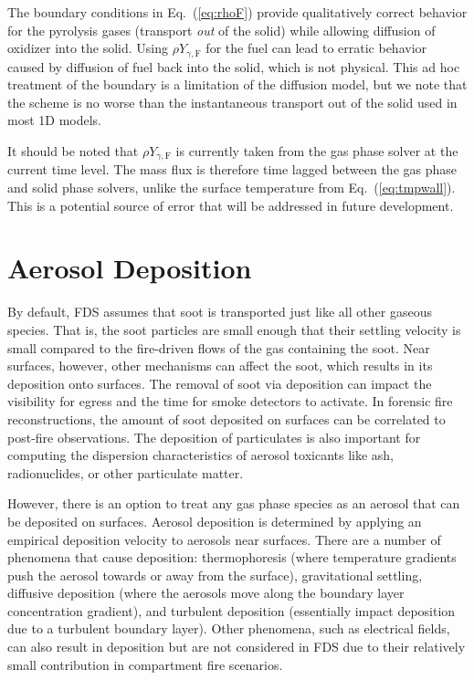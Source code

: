 The boundary conditions in Eq.~(\ref{eq:rhoF}) provide qualitatively correct behavior for the pyrolysis gases (transport \emph{out} of the solid) while allowing diffusion of oxidizer into the solid.  Using $\rho Y_{\gamma,\mathrm{F}}$ for the fuel can lead to erratic behavior caused by diffusion of fuel back into the solid, which is not physical.  This ad hoc treatment of the boundary is a limitation of the diffusion model, but we note that the scheme is no worse than the instantaneous transport out of the solid used in most 1D models.

It should be noted that $\rho Y_{\gamma,\mathrm{F}}$ is currently taken from the gas phase solver at the current time level.  The mass flux is therefore time lagged between the gas phase and solid phase solvers, unlike the surface temperature from Eq.~(\ref{eq:tmpwall}).  This is a potential source of error that will be addressed in future development.


\newpage
\section{Aerosol Deposition}

By default, FDS assumes that soot is transported just like all other gaseous species. That is, the soot particles are small enough that their settling velocity is small compared to the fire-driven flows of the gas containing the soot. Near surfaces, however, other mechanisms can affect the soot, which results in its deposition onto surfaces. The removal of soot via deposition can impact the visibility for egress and the time for smoke detectors to activate. In forensic fire reconstructions, the amount of soot deposited on surfaces can be correlated to post-fire observations. The deposition of particulates is also important for computing the dispersion characteristics of aerosol toxicants like ash, radionuclides, or other particulate matter.

However, there is an option to treat any gas phase species as an aerosol that can be deposited on surfaces. Aerosol deposition is determined by applying an empirical deposition velocity to aerosols near surfaces. There are a number of phenomena that cause deposition: thermophoresis (where temperature gradients push the aerosol towards or away from the surface), gravitational settling, diffusive deposition (where the aerosols move along the boundary layer concentration
gradient), and turbulent deposition (essentially impact deposition due to a turbulent boundary layer). Other phenomena, such as electrical fields, can also result in deposition but are not considered in FDS due to their relatively small contribution in compartment fire scenarios.

